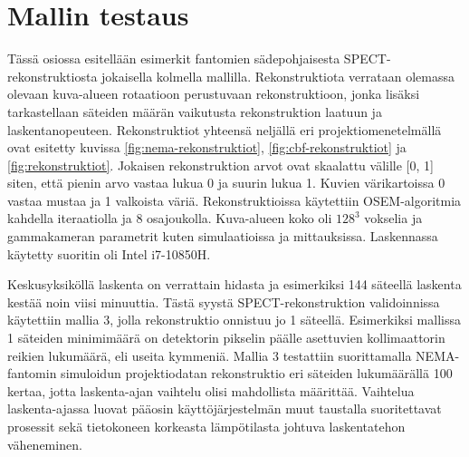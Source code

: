 \section{Mallin testaus}
Tässä osiossa esitellään esimerkit fantomien sädepohjaisesta SPECT-rekonstruktiosta jokaisella kolmella mallilla. Rekonstruktiota verrataan olemassa olevaan kuva-alueen rotaatioon perustuvaan rekonstruktioon, jonka lisäksi tarkastellaan säteiden määrän vaikutusta rekonstruktion laatuun ja laskentanopeuteen. Rekonstruktiot yhteensä neljällä eri projektiomenetelmällä ovat esitetty kuvissa \ref{fig:nema-rekonstruktiot}, \ref{fig:cbf-rekonstruktiot} ja \ref{fig:rekonstruktiot}. Jokaisen rekonstruktion arvot ovat skaalattu välille [0, 1] siten, että pienin arvo vastaa lukua 0 ja suurin lukua 1. Kuvien värikartoissa 0 vastaa mustaa ja 1 valkoista väriä. Rekonstruktioissa käytettiin OSEM-algoritmia kahdella iteraatiolla ja 8 osajoukolla. Kuva-alueen koko oli $128^3$ vokselia ja gammakameran parametrit kuten simulaatioissa ja mittauksissa. Laskennassa käytetty suoritin oli Intel i7-10850H.

Keskusyksiköllä laskenta on verrattain hidasta ja esimerkiksi 144 säteellä laskenta kestää noin viisi minuuttia. Tästä syystä SPECT-rekonstruktion validoinnissa käytettiin mallia 3, jolla rekonstruktio onnistuu jo 1 säteellä. Esimerkiksi mallissa 1 säteiden minimimäärä on detektorin pikselin päälle asettuvien kollimaattorin reikien lukumäärä, eli useita kymmeniä. Mallia 3 testattiin suorittamalla NEMA-fantomin simuloidun projektiodatan rekonstruktio eri säteiden lukumäärällä 100 kertaa, jotta laskenta-ajan vaihtelu olisi mahdollista määrittää. Vaihtelua laskenta-ajassa luovat pääosin käyttöjärjestelmän muut taustalla suoritettavat prosessit sekä tietokoneen korkeasta lämpötilasta johtuva laskentatehon väheneminen.


